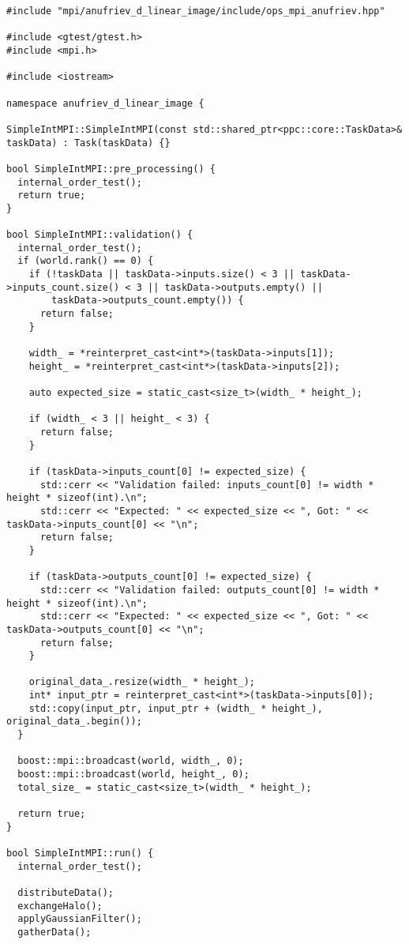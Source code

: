 \documentclass[12pt]{article}
\begin{document}
\begin{lstlisting}
#include "mpi/anufriev_d_linear_image/include/ops_mpi_anufriev.hpp"

#include <gtest/gtest.h>
#include <mpi.h>

#include <iostream>

namespace anufriev_d_linear_image {

SimpleIntMPI::SimpleIntMPI(const std::shared_ptr<ppc::core::TaskData>& taskData) : Task(taskData) {}

bool SimpleIntMPI::pre_processing() {
  internal_order_test();
  return true;
}

bool SimpleIntMPI::validation() {
  internal_order_test();
  if (world.rank() == 0) {
    if (!taskData || taskData->inputs.size() < 3 || taskData->inputs_count.size() < 3 || taskData->outputs.empty() ||
        taskData->outputs_count.empty()) {
      return false;
    }

    width_ = *reinterpret_cast<int*>(taskData->inputs[1]);
    height_ = *reinterpret_cast<int*>(taskData->inputs[2]);

    auto expected_size = static_cast<size_t>(width_ * height_);

    if (width_ < 3 || height_ < 3) {
      return false;
    }

    if (taskData->inputs_count[0] != expected_size) {
      std::cerr << "Validation failed: inputs_count[0] != width * height * sizeof(int).\n";
      std::cerr << "Expected: " << expected_size << ", Got: " << taskData->inputs_count[0] << "\n";
      return false;
    }

    if (taskData->outputs_count[0] != expected_size) {
      std::cerr << "Validation failed: outputs_count[0] != width * height * sizeof(int).\n";
      std::cerr << "Expected: " << expected_size << ", Got: " << taskData->outputs_count[0] << "\n";
      return false;
    }

    original_data_.resize(width_ * height_);
    int* input_ptr = reinterpret_cast<int*>(taskData->inputs[0]);
    std::copy(input_ptr, input_ptr + (width_ * height_), original_data_.begin());
  }

  boost::mpi::broadcast(world, width_, 0);
  boost::mpi::broadcast(world, height_, 0);
  total_size_ = static_cast<size_t>(width_ * height_);

  return true;
}

bool SimpleIntMPI::run() {
  internal_order_test();

  distributeData();
  exchangeHalo();
  applyGaussianFilter();
  gatherData();


\end{lstlisting}
\end{document}
